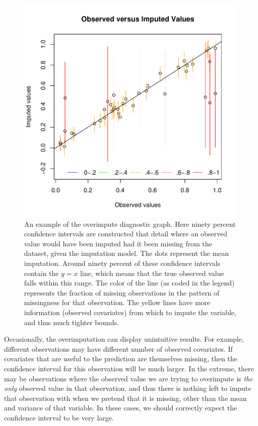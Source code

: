 \documentclass[12pt,titlepage]{article}
\begin{document}
\begin{figure}[htp!]\label{f:oi}
  \centering \includegraphics[scale=.8]{overimp.pdf}
  \caption{ An example of the overimpute diagnostic graph.  Here ninety percent confidence intervals are constructed that detail where an observed value would have been imputed had it been missing from the dataset, given the imputation model.  The dots represent the mean imputation.  Around ninety percent of these confidence intervals contain the $y=x$ line, which means that the true observed value falls within this range.  The color of the line (as coded in the legend) represents the fraction of missing observations in the pattern of missingness for that observation.  The yellow lines have more information (observed covariates) from which to impute the variable, and thus much tighter bounds.}
\end{figure}


Occasionally, the overimputation can display unintuitive results.  For
example, different observations may have different number of observed
covariates.  If covariates that are useful to the prediction are
themselves missing, then the confidence interval for this observation
will be much larger.  In the extreme, there may be observations where
the observed value we are trying to overimpute is \emph{the only}
observed value in that observation, and thus there is nothing left to
impute that observation with when we pretend that it is missing, other
than the mean and variance of that variable.  In these cases, we
should correctly expect the confidence interval to be very large.
\end{document}
